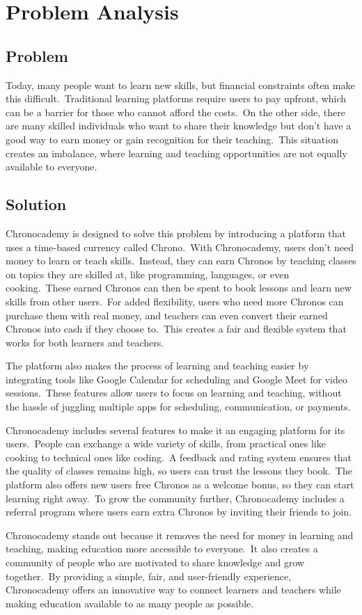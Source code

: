 \section{Problem Analysis}\label{sec:problem-analisys}

\subsection{Problem}\label{subsec:problem}
Today, many people want to learn new skills, but financial constraints often make this difficult.\ Traditional learning platforms require users to pay upfront, which can be a barrier for those who cannot afford the costs.\ On the other side, there are many skilled individuals who want to share their knowledge but don’t have a good way to earn money or gain recognition for their teaching.\ This situation creates an imbalance, where learning and teaching opportunities are not equally available to everyone.

\subsection{Solution}\label{subsec:solution}
Chronocademy is designed to solve this problem by introducing a platform that uses a time-based currency called Chrono.\ With Chronocademy, users don’t need money to learn or teach skills.\ Instead, they can earn Chronos by teaching classes on topics they are skilled at, like programming, languages, or even cooking.\ These earned Chronos can then be spent to book lessons and learn new skills from other users.\ For added flexibility, users who need more Chronos can purchase them with real money, and teachers can even convert their earned Chronos into cash if they choose to.\ This creates a fair and flexible system that works for both learners and teachers.

The platform also makes the process of learning and teaching easier by integrating tools like Google Calendar for scheduling and Google Meet for video sessions.\ These features allow users to focus on learning and teaching, without the hassle of juggling multiple apps for scheduling, communication, or payments.

Chronocademy includes several features to make it an engaging platform for its users.\ People can exchange a wide variety of skills, from practical ones like cooking to technical ones like coding.\ A feedback and rating system ensures that the quality of classes remains high, so users can trust the lessons they book.\ The platform also offers new users free Chronos as a welcome bonus, so they can start learning right away.\ To grow the community further, Chronocademy includes a referral program where users earn extra Chronos by inviting their friends to join.

Chronocademy stands out because it removes the need for money in learning and teaching, making education more accessible to everyone.\ It also creates a community of people who are motivated to share knowledge and grow together.\ By providing a simple, fair, and user-friendly experience, Chronocademy offers an innovative way to connect learners and teachers while making education available to as many people as possible.